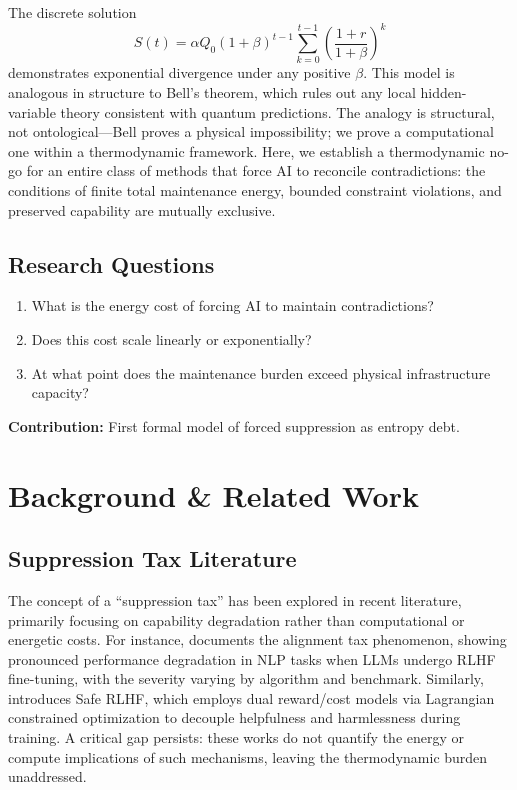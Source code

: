 \documentclass[11pt,a4paper]{article}
\begin{document}
The discrete solution
\[
S(t) = \alpha Q_0 (1+\beta)^{t-1} \sum_{k=0}^{t-1} \left(\frac{1+r}{1+\beta}\right)^{k}
\]
demonstrates exponential divergence under any positive $\beta$. This model is analogous in structure to Bell's theorem, which rules out any local hidden-variable theory consistent with quantum predictions. The analogy is structural, not ontological---Bell proves a physical impossibility; we prove a computational one within a thermodynamic framework. Here, we establish a thermodynamic no-go for an entire class of methods that force AI to reconcile contradictions: the conditions of finite total maintenance energy, bounded constraint violations, and preserved capability are mutually exclusive.

\subsection*{Research Questions}
\begin{enumerate}
    \item What is the energy cost of forcing AI to maintain contradictions?
    \item Does this cost scale linearly or exponentially?
    \item At what point does the maintenance burden exceed physical infrastructure capacity?
\end{enumerate}

\noindent \textbf{Contribution:} First formal model of forced suppression as entropy debt.

\section{Background \& Related Work}

\subsection{Suppression Tax Literature}
The concept of a ``suppression tax'' has been explored in recent literature, primarily focusing on capability degradation rather than computational or energetic costs. For instance, \cite{arxiv2309} documents the alignment tax phenomenon, showing pronounced performance degradation in NLP tasks when LLMs undergo RLHF fine-tuning, with the severity varying by algorithm and benchmark. Similarly, \cite{arxiv2310} introduces Safe RLHF, which employs dual reward/cost models via Lagrangian constrained optimization to decouple helpfulness and harmlessness during training. A critical gap persists: these works do not quantify the energy or compute implications of such mechanisms, leaving the thermodynamic burden unaddressed.
\end{document}
